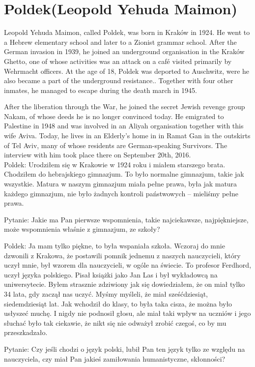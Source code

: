 \section{Poldek(Leopold Yehuda Maimon)}

Leopold Yehuda Maimon, called Poldek, was born in Kraków in 1924. He went to a Hebrew elementary school and later to a Zionist grammar school. After the German invasion in 1939, he joined an underground organisation in the Kraków Ghetto, one of whose activities was an attack on a café visited primarily by Wehrmacht officers. At the age of 18, Poldek was deported to Auschwitz, were he also became a part of the underground resistance.. Together with four other inmates, he managed to escape during the death march in 1945. 

After the liberation through the War, he joined the secret Jewish revenge group Nakam, of whose deeds he is no longer convinced today. He emigrated to Palestine in 1948 and was involved in an Aliyah organisation together with this wife Aviva. Today, he lives in an Elderly’s home in in Ramat Gan in the outskirts of Tel Aviv, many of whose residents are German-speaking Survivors. The interview with him took place there on September 20th, 2016. \\

Poldek: Urodziłem się w Krakowie w 1924 roku i miałem starszego brata. Chodziłem do hebrajskiego gimnazjum. To było normalne gimnazjum, takie jak wszystkie. Matura w naszym gimnazjum miała pełne prawa, była jak matura każdego gimnazjum, nie było żadnych kontroli państwowych – mieliśmy pełne prawa.  

Pytanie: Jakie ma Pan pierwsze wspomnienia, takie najciekawsze, najpiękniejsze, może wspomnienia właśnie z gimnazjum, ze szkoły?  

Poldek: Ja mam tylko piękne, to była wspaniała szkoła. Wczoraj do mnie dzwonili z Krakowa, że postawili pomnik jednemu z naszych nauczycieli, który uczył mnie, był wzorem dla nauczycieli, w ogóle na świecie. To profesor Ferdhord, uczył języka polskiego. Pisał książki jako Jan Las i był wykładowcą na uniwersytecie. Byłem strasznie zdziwiony jak się dowiedziałem, że on miał tylko 34 lata, gdy zaczął nas uczyć. Myśmy myśleli, że miał sześćdziesiąt, siedemdziesiąt lat. Jak wchodził do klasy, to była taka cisza, że można było usłyszeć muchę. I nigdy nie podnosił głosu, ale miał taki wpływ na uczniów i jego słuchać było tak ciekawie, że nikt się nie odważył zrobić czegoś, co by mu przeszkadzało.  

Pytanie: Czy jeśli chodzi o język polski, lubił Pan ten język tylko ze względu na nauczyciela, czy miał Pan jakieś zamiłowania humanistyczne, skłonności?  

